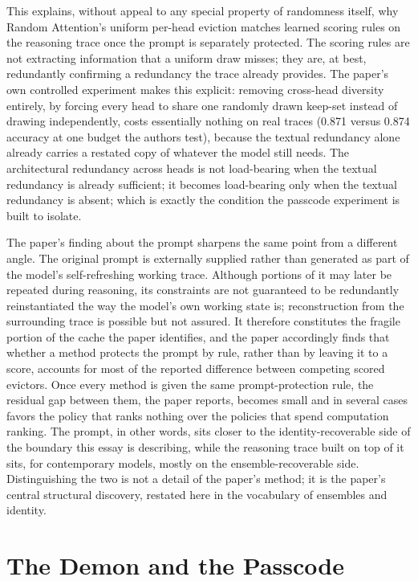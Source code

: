 \documentclass[11pt]{article}
\begin{document}
This explains, without appeal to any special property of randomness itself, why Random Attention's uniform per-head eviction matches learned scoring rules on the reasoning trace once the prompt is separately protected. The scoring rules are not extracting information that a uniform draw misses; they are, at best, redundantly confirming a redundancy the trace already provides. The paper's own controlled experiment makes this explicit: removing cross-head diversity entirely, by forcing every head to share one randomly drawn keep-set instead of drawing independently, costs essentially nothing on real traces (0.871 versus 0.874 accuracy at one budget the authors test), because the textual redundancy alone already carries a restated copy of whatever the model still needs. The architectural redundancy across heads is not load-bearing when the textual redundancy is already sufficient; it becomes load-bearing only when the textual redundancy is absent; which is exactly the condition the passcode experiment is built to isolate.

The paper's finding about the prompt sharpens the same point from a different angle. The original prompt is externally supplied rather than generated as part of the model's self-refreshing working trace. Although portions of it may later be repeated during reasoning, its constraints are not guaranteed to be redundantly reinstantiated the way the model's own working state is; reconstruction from the surrounding trace is possible but not assured. It therefore constitutes the fragile portion of the cache the paper identifies, and the paper accordingly finds that whether a method protects the prompt by rule, rather than by leaving it to a score, accounts for most of the reported difference between competing scored evictors. Once every method is given the same prompt-protection rule, the residual gap between them, the paper reports, becomes small and in several cases favors the policy that ranks nothing over the policies that spend computation ranking. The prompt, in other words, sits closer to the identity-recoverable side of the boundary this essay is describing, while the reasoning trace built on top of it sits, for contemporary models, mostly on the ensemble-recoverable side. Distinguishing the two is not a detail of the paper's method; it is the paper's central structural discovery, restated here in the vocabulary of ensembles and identity.

\section{The Demon and the Passcode}
\end{document}
